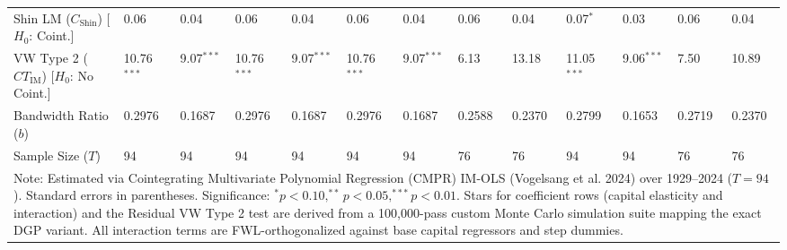 \begin{table}[H]
\begin{tabular}{p{3.8cm}p{1.1cm}p{1.1cm}p{1.1cm}p{1.1cm}p{1.1cm}p{1.1cm}p{1.1cm}p{1.1cm}p{1.1cm}p{1.1cm}p{1.1cm}p{1.1cm}}
Shin LM ($C_{\text{Shin}}$) [$H_0$: Coint.] & 0.06 & 0.04 & 0.06 & 0.04 & 0.06 & 0.04 & 0.06 & 0.04 & 0.07$^{*}$ & 0.03 & 0.06 & 0.04 \\
VW Type 2 ($CT_{\text{IM}}$) [$H_0$: No Coint.] & 10.76$^{***}$ & 9.07$^{***}$ & 10.76$^{***}$ & 9.07$^{***}$ & 10.76$^{***}$ & 9.07$^{***}$ & 6.13 & 13.18 & 11.05$^{***}$ & 9.06$^{***}$ & 7.50 & 10.89 \\
\midrule
Bandwidth Ratio ($b$) & 0.2976 & 0.1687 & 0.2976 & 0.1687 & 0.2976 & 0.1687 & 0.2588 & 0.2370 & 0.2799 & 0.1653 & 0.2719 & 0.2370 \\
Sample Size ($T$) & 94 & 94 & 94 & 94 & 94 & 94 & 76 & 76 & 94 & 94 & 76 & 76 \\
\bottomrule
\multicolumn{13}{p{14.5cm}}{\footnotesize Note: Estimated via Cointegrating Multivariate Polynomial Regression (CMPR) IM-OLS (Vogelsang et al. 2024) over 1929--2024 ($T=94$). Standard errors in parentheses. Significance: $^* p < 0.10, ^{**} p < 0.05, ^{***} p < 0.01$. Stars for coefficient rows (capital elasticity and interaction) and the Residual VW Type 2 test are derived from a 100,000-pass custom Monte Carlo simulation suite mapping the exact DGP variant. All interaction terms are FWL-orthogonalized against base capital regressors and step dummies.}
\end{tabular}
\end{table}
